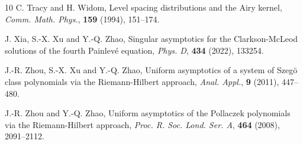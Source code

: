 \documentclass[11pt,a4paper]{article}
\numberwithin{equation}{section}
\begin{document}
\begin{thebibliography}{10}
C. Tracy and H. Widom, Level spacing distributions and the Airy kernel, {\it Comm. Math. Phys.}, {\bf 159} (1994), 151--174.

J. Xia, S.-X. Xu and Y.-Q. Zhao, Singular asymptotics for the Clarkson-McLeod solutions of the fourth Painlev\'{e} equation, {\it Phys. D}, {\bf 434} (2022), 133254.


J.-R. Zhou, S.-X. Xu and Y.-Q. Zhao, Uniform asymptotics of a system of Szeg\"{o} class
polynomials via the Riemann-Hilbert approach, {\it Anal. Appl.}, {\bf 9} (2011), 447--480.

J.-R. Zhou and Y.-Q. Zhao, Uniform asymptotics of the Pollaczek polynomials via the Riemann-Hilbert approach, {\it Proc. R. Soc. Lond. Ser. A}, {\bf 464} (2008), 2091--2112.

\end{thebibliography}
\end{document}
